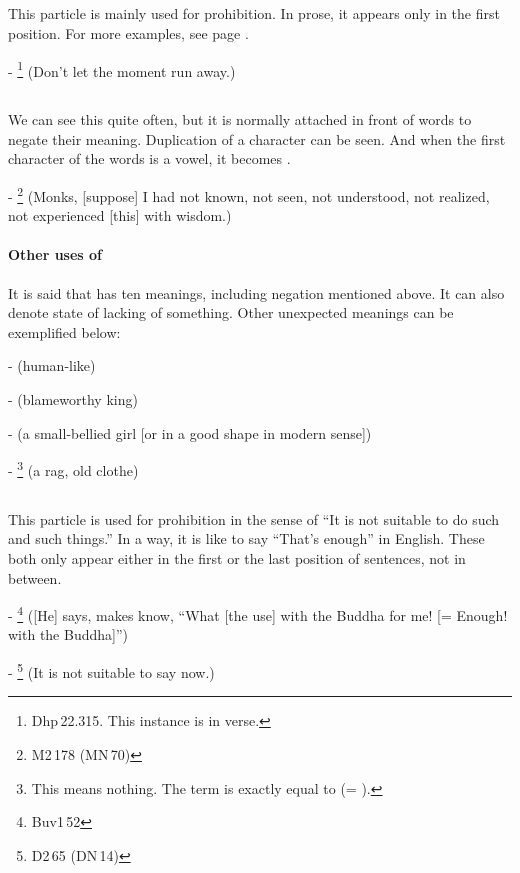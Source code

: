 \subsection*{}\label{nip:maa}
This particle is mainly used for prohibition. In prose, it appears only in the first position. For more examples, see page \pageref{par:vclassma}.\par
- \footnote{Dhp\,22.315. This instance is in verse.} (Don't let the moment run away.)\par

\subsection*{}\label{nip:a}
We can see this quite often, but it is normally attached in front of words to negate their meaning. Duplication of a character can be seen. And when the first character of the words is a vowel, it becomes .\par
- \footnote{M2\,178 (MN\,70)} (Monks, [suppose] I had not known, not seen, not understood, not realized, not experienced [this] with wisdom.) \par
\paragraph*{Other uses of } It is said that  has ten meanings, including negation mentioned above. It can also denote state of lacking of something. Other unexpected meanings can be exemplified below:\par
-  (human-like) \par
-  (blameworthy king) \par
-  (a small-bellied girl [or in a good shape in modern sense]) \par
- \footnote{This  means nothing. The term is exactly equal to  (= ).} (a rag, old clothe) \par

\subsection*{}\label{nip:aladm}\label{nip:haladm}
This particle is used for prohibition in the sense of ``It is not suitable to do such and such things.'' In a way, it is like to say ``That's enough'' in English. These both only appear either in the first or the last position of sentences, not in between.\par
- \footnote{Buv1\,52} ([He] says, makes know, ``What [the use] with the Buddha for me! [= Enough! with the Buddha]'') \par
- \footnote{D2\,65 (DN\,14)} (It is not suitable to say now.) \par
